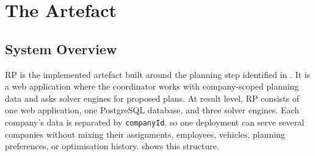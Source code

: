 \section{The Artefact}
\label{sec:the-artefact}
\label{sec:engineering-results}

\subsection{System Overview}
\label{sec:system-description}
\label{sec:requirements}

RP is the implemented artefact built around the planning step identified in . It is a web application where the coordinator works with company-scoped planning data and asks solver engines for proposed plans. At result level, RP consists of one web application, one PostgreSQL database, and three solver engines. Each company's data is separated by \texttt{companyId}, so one deployment can serve several companies without mixing their assignments, employees, vehicles, planning preferences, or optimisation history.  shows this structure.

